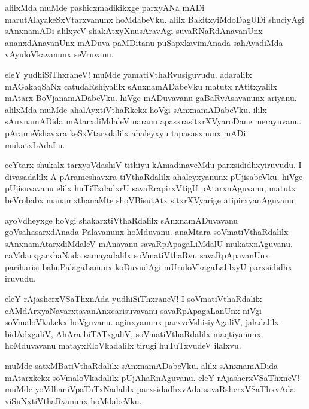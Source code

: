 \documentclass{article}
\begin{document}
\begin{mn}
alilxMda muMde pashicxmadikikxge parxyANa mADi marutAlayakeSxVtarxvanunx hoMdabeVku. 
alilx BakitxyiMdoDagUDi shuciyAgi sAnxnamADi alilxyeV shakAtxyXnusAravAgi suvaRNaRdAnavanUnx 
ananxdAnavanUnx mADuva paMDitanu puSapxkavimAnada sahAyadiMda vAyuloVkavanunx seVruvanu.
\end{mn}

\begin{mn}
eleY yudhiSiThxraneV! muMde yamatiVthaRvusiguvudu. adaralilx mAGakaqSaNx catudaRshiyalilx 
sAnxnamADabeVku matutx rAtitxyalilx mAtarx BoVjanamADabeVku. hiVge mADuvavanu gaBaRvAsavanunx 
ariyanu. alilxMda muMde ahalAyxtiVthaRkekx hoVgi sAnxnamADabeVku. ililx sAnxnamADida 
mAtarxdiMdaleV naranu apasxrasitxrXVyaroDane merayuvanu. pArameVshavxra keSxVtarxdalilx ahaleyxyu 
tapasasxnunx mADi mukatxLAdaLu.
\end{mn}

\begin{mn}
ceYtarx shukalx tarxyoVdashiV tithiyu kAmadinaveMdu parxsididhxyiruvudu. I divasadalilx  A 
pArameshavxra tiVthaRdalilx ahaleyxyanunx pUjisabeVku. hiVge pUjisuvavanu elilx huTiTxdadxrU 
savaRrapirxVtigU pAtarxnAguvanu; matutx beVrobabx manamxthanaMte shoVBisutAtx sitxrXVyarige 
atipirxyanAguvanu. 
\end{mn}

\begin{mn}
ayoVdheyxge hoVgi shakarxtiVthaRdalilx sAnxnamADuvavanu goVsahasarxdAnada Palavanunx hoMduvanu. 
anaMtara soVmatiVthaRdalilx sAnxnamAtarxdiMdaleV mAnavanu savaRpApagaLiMdalU mukatxnAguvanu. 
caMdarxgarxhaNada samayadalilx soVmatiVthaRvu savaRpApavanUnx pariharisi bahuPalagaLanunx 
koDuvudAgi mUruloVkagaLalilxyU parxsididhx iruvudu.
\end{mn}

\begin{mn}
eleY rAjasherxVSaThxnAda yudhiSiThxraneV! I soVmatiVthaRdalilx  cAMdArxyaNavarxtavanAnxcarisuvavanu 
savaRpApagaLanUnx niVgi soVmaloVkakekx hoVguvanu. aginxyanunx parxveVshisiyAgaliV, jaladalilx 
bidAdxgaliV, AhAra biTATxgaliV, soVmatiVthaRdalilx maqtiyanunx hoMduvavanu matayxRloVkadalilx tirugi
huTuTxvudeV ilalxvu.
\end{mn}

\begin{mn}
muMde satxMBatiVthaRdalilx sAnxnamADabeVku. alilx sAnxnamADida mAtarxkekx soVmaloVkadalilx 
pUjAhaRnAguvanu. eleY rAjasherxVSaThxneV!  muMde yoVdhaniVpaTaTxNadalilx parxsidadhxvAda 
savaRsherxVSaThxvAda viSuNxtiVthaRvanunx hoMdabeVku.
\end{mn}
\end{document}

